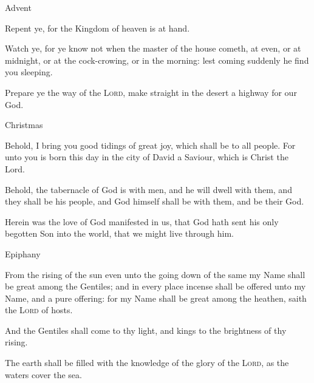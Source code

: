 \begin{multicols}{2}
\begin{inhead}
Advent
\end{inhead}\noindent
    Repent ye, for the Kingdom of heaven is at hand.
    \par
    Watch ye, for ye know not when the master of the house cometh, at even, or at midnight, or at the cock-crowing, or in the morning: lest coming suddenly he find you sleeping.
    \par
    Prepare ye the way of the \textsc{Lord}, make straight in the desert a highway for our God.

\begin{inhead}
Christmas
\end{inhead}\noindent
    Behold, I bring you good tidings of great joy, which shall be to all people. For unto you is born this day in the city of David a Saviour, which is Christ the Lord.
    \par
    Behold, the tabernacle of God is with men, and he will dwell with them, and they shall be his people, and God himself shall be with them, and be their God.
    \par
    Herein was the love of God manifested in us, that God hath sent his only begotten Son into the world, that we might live through him. 
    \par

\begin{inhead}
Epiphany
\end{inhead}\noindent
    From the rising of the sun even unto the going down of the same my Name shall be great among the Gentiles; and in every place incense shall be offered unto my Name, and a pure offering: for my Name shall be great among the heathen, saith the \textsc{Lord} of hosts.
    
    And the Gentiles shall come to thy light, and kings to the brightness of thy rising.\par
    The earth shall be filled with the knowledge of the glory of the \textsc{Lord}, as the waters cover the sea.

\columnbreak


\end{multicols}

